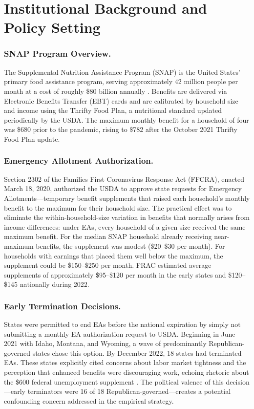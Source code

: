 \documentclass[12pt]{article}
\begin{document}
\section{Institutional Background and Policy Setting}

\subsubsection*{SNAP Program Overview.} The Supplemental Nutrition Assistance Program (SNAP) is the United States' primary food assistance program, serving approximately 42 million people per month at a cost of roughly \$80 billion annually . Benefits are delivered via Electronic Benefits Transfer (EBT) cards and are calibrated by household size and income using the Thrifty Food Plan, a nutritional standard updated periodically by the USDA. The maximum monthly benefit for a household of four was \$680 prior to the pandemic, rising to \$782 after the October 2021 Thrifty Food Plan update.

\subsubsection*{Emergency Allotment Authorization.} Section 2302 of the Families First Coronavirus Response Act (FFCRA), enacted March 18, 2020, authorized the USDA to approve state requests for Emergency Allotments---temporary benefit supplements that raised each household's monthly benefit to the maximum for their household size. The practical effect was to eliminate the within-household-size variation in benefits that normally arises from income differences: under EAs, every household of a given size received the same maximum benefit. For the median SNAP household already receiving near-maximum benefits, the supplement was modest (\$20--\$30 per month). For households with earnings that placed them well below the maximum, the supplement could be \$150--\$250 per month. FRAC  estimated average supplements of approximately \$95--\$120 per month in the early states and \$120--\$145 nationally during 2022.

\subsubsection*{Early Termination Decisions.} States were permitted to end EAs before the national expiration by simply not submitting a monthly EA authorization request to USDA. Beginning in June 2021 with Idaho, Montana, and Wyoming, a wave of predominantly Republican-governed states chose this option. By December 2022, 18 states had terminated EAs. These states explicitly cited concerns about labor market tightness and the perception that enhanced benefits were discouraging work, echoing rhetoric about the \$600 federal unemployment supplement \citep{ganong2019consumer}. The political valence of this decision---early terminators were 16 of 18 Republican-governed---creates a potential confounding concern addressed in the empirical strategy.
\end{document}
